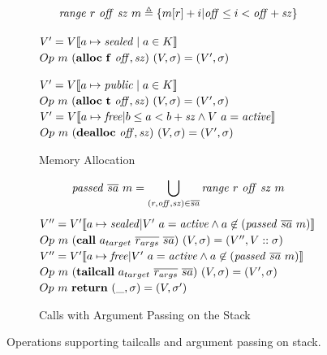 \documentclass[10pt,conference]{ieeetran}%
\theoremstyle{definition}
\begin{document}
\begin{figure}
  \begin{subfigure}{0.4\textwidth}
    \[\mathit{range} ~ r ~ \mathit{off} ~ \mathit{sz} ~ m \triangleq
    \{m[r]+i | \mathit{off} \leq i < \mathit{off+sz}\}\]

               {\(V' = V \llbracket a \mapsto \mathit{sealed} \mid a \in K \rrbracket\)}
               {\(Op ~ m ~ (\mathbf{alloc} ~ \mathbf{f} ~ \mathit{off, sz}) ~ (V,\sigma) = (V',\sigma)\)}

               {\(V' = V \llbracket a \mapsto \mathit{public} \mid a \in K \rrbracket\)}
               {\(Op ~ m ~ (\mathbf{alloc} ~ \mathbf{t} ~ \mathit{off, sz}) ~ (V,\sigma) = (V',\sigma)\)}
               {\(V' = V \llbracket a \mapsto \mathit{free} |
                 b \leq a < b+\mathit{sz} \land V ~ a = \mathit{active} \rrbracket\)}
               {\(Op ~ m ~ (\mathbf{dealloc} ~ \mathit{off, sz}) ~ (V,\sigma) = (V',\sigma)\)}

    \caption{Memory Allocation}
    \label{sfig:publicalloc}
  \end{subfigure}
  \begin{subfigure}{0.6\textwidth}
    \[\mathit{passed} ~ \overline{sa} ~ m = \bigcup_{(r,\mathit{off},\mathit{sz}) \in \overline{sa}}
    \mathit{range} ~ r ~ \mathit{off} ~ \mathit{sz} ~ m\]
               {\(V'' = V'\llbracket a \mapsto \mathit{sealed} | V' ~ a = \mathit{active} \land a \not \in (\mathit{passed} ~ \overline{sa} ~ m) \rrbracket\)}
               {\(Op ~ m ~ (\mathbf{call} ~ a_{target} ~ \overline{r_{args}} ~ \overline{sa})
                 ~ (V,\sigma) = (V'',V::\sigma)\)}
               {\(V'' = V'\llbracket a \mapsto \mathit{free} | V' ~ a = \mathit{active} \land a \not \in (\mathit{passed} ~ \overline{sa} ~ m) \rrbracket\)}
               {\(Op ~ m ~ (\mathbf{tailcall} ~ a_{target} ~ \overline{r_{args}} ~ \overline{sa})
                 ~ (V,\sigma) = (V',\sigma)\)}
             {\(Op ~ m ~ \mathbf{return} ~ (\_, \sigma) = (V, \sigma')\)}

    \caption{Calls with Argument Passing on the Stack}
    \label{sfig:stkargs}
  \end{subfigure}
  \caption{Operations supporting tailcalls and argument passing on stack.}
  \label{fig:advops}
\end{figure}
\end{document}
